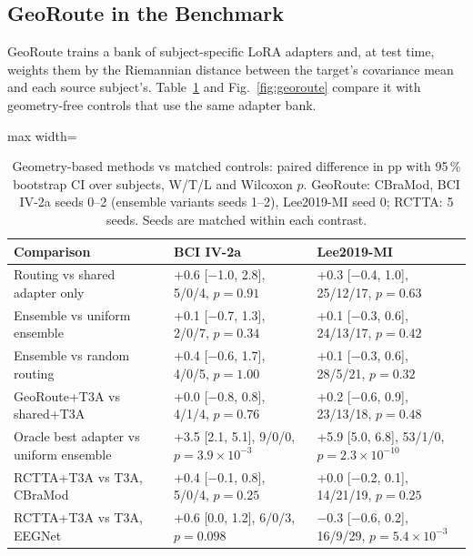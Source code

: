 \documentclass[preprint,12pt]{elsarticle}
\newcommand{\revfloat}{}
\begin{document}
\subsection{GeoRoute in the Benchmark}\label{sec:georoute}
GeoRoute trains a bank of subject-specific LoRA adapters and, at test time, weights them by the Riemannian distance between the target's covariance mean and each source subject's. Table~\ref{tab:georoute} and Fig.~\ref{fig:georoute} compare it with geometry-free controls that use the same adapter bank.

\begin{table}[!htbp]
\centering
\caption{Geometry-based methods vs matched controls: paired difference in pp with 95\,\% bootstrap CI over subjects, W/T/L and Wilcoxon $p$. GeoRoute: CBraMod, BCI IV-2a seeds 0--2 (ensemble variants seeds 1--2), Lee2019-MI seed 0; RCTTA: 5 seeds. Seeds are matched within each contrast.}
\label{tab:georoute}
\revfloat
\setlength{\tabcolsep}{3pt}
\begin{adjustbox}{max width=\textwidth}
\begin{tabular}{@{}>{\raggedright\arraybackslash}p{2.6cm}>{\raggedright\arraybackslash}p{2.9cm}>{\raggedright\arraybackslash}p{2.9cm}@{}}
\toprule
Comparison & BCI IV-2a & Lee2019-MI \\
\midrule
Routing vs shared adapter only & +0.6 [$-$1.0, 2.8], 5/0/4, $p=0.91$ & +0.3 [$-$0.4, 1.0], 25/12/17, $p=0.63$ \\
Ensemble vs uniform ensemble & +0.1 [$-$0.7, 1.3], 2/0/7, $p=0.34$ & +0.1 [$-$0.3, 0.6], 24/13/17, $p=0.42$ \\
Ensemble vs random routing & +0.4 [$-$0.6, 1.7], 4/0/5, $p=1.00$ & +0.1 [$-$0.3, 0.6], 28/5/21, $p=0.32$ \\
GeoRoute+T3A vs shared+T3A & +0.0 [$-$0.8, 0.8], 4/1/4, $p=0.76$ & +0.2 [$-$0.6, 0.9], 23/13/18, $p=0.48$ \\
Oracle best adapter vs uniform ensemble & +3.5 [2.1, 5.1], 9/0/0, $p=3.9{\times}10^{-3}$ & +5.9 [5.0, 6.8], 53/1/0, $p=2.3{\times}10^{-10}$ \\
RCTTA+T3A vs T3A, CBraMod & +0.4 [$-$0.1, 0.8], 5/0/4, $p=0.25$ & +0.0 [$-$0.2, 0.1], 14/21/19, $p=0.25$ \\
RCTTA+T3A vs T3A, EEGNet & +0.6 [0.0, 1.2], 6/0/3, $p=0.098$ & $-$0.3 [$-$0.6, 0.2], 16/9/29, $p=5.4{\times}10^{-3}$ \\
\bottomrule
\end{tabular}
\end{adjustbox}
\end{table}
\end{document}
